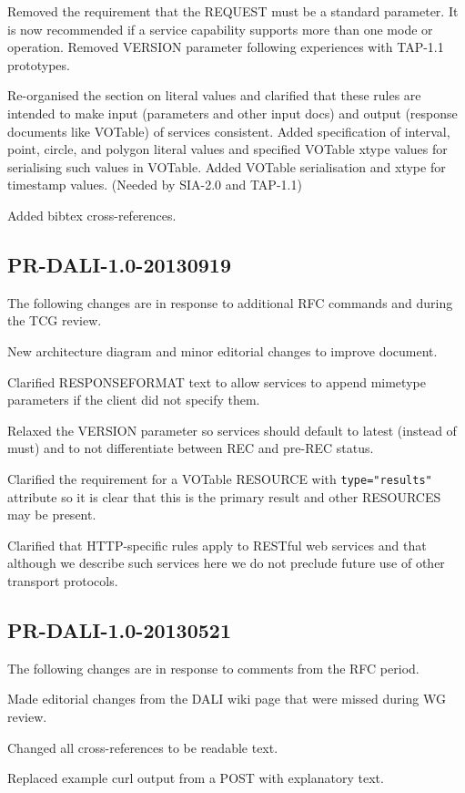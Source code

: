 \documentclass[11pt,letter]{ivoa}
\begin{document}
Removed the requirement that the REQUEST must be a standard parameter. It is 
now recommended if a service capability supports more than one mode or 
operation. Removed VERSION parameter following experiences with TAP-1.1 
prototypes.

Re-organised the section on literal values and clarified that these rules 
are intended to make input (parameters and other input docs) and output 
(response documents like VOTable) of services consistent. Added specification 
of interval, point, circle, and polygon literal values and specified VOTable 
xtype values for serialising such values in VOTable. Added VOTable serialisation 
and xtype for timestamp values. (Needed by SIA-2.0 and TAP-1.1)

Added bibtex cross-references.

\subsection{PR-DALI-1.0-20130919}
The following changes are in response to additional RFC commands and during the 
TCG review.

New architecture diagram and minor editorial changes to improve document.

Clarified RESPONSEFORMAT text to allow services to append mimetype parameters if 
the client did not specify them.

Relaxed the VERSION parameter so services should default to latest (instead of 
must) and to not differentiate between REC and pre-REC status.

Clarified the requirement for a VOTable RESOURCE with \verb|type="results"| attribute 
so it is clear that this is the primary result and other RESOURCES may be 
present.

Clarified that HTTP-specific rules apply to RESTful web services and that 
although we describe such services here we do not preclude future use of other 
transport protocols.

\subsection{PR-DALI-1.0-20130521}
The following changes are in response to comments from the RFC period.

Made editorial changes from the DALI wiki page that were missed during WG 
review.

Changed all cross-references to be readable text.

Replaced example curl output from a POST with explanatory text.
\end{document}

